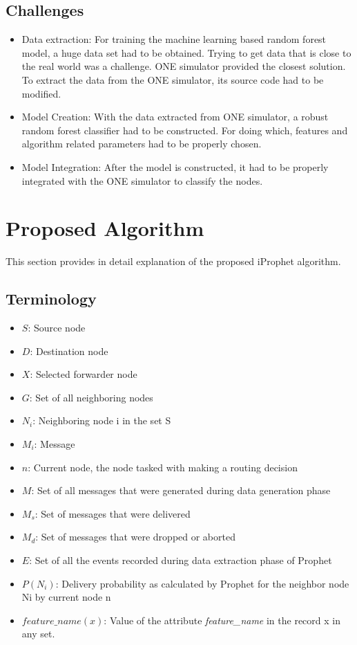 \documentclass[10pt,journal]{IEEEtran}
\begin{document}
\subsection{Challenges}
\begin{itemize}
	\item Data extraction: For training the machine learning based random forest model, a huge data set had to be obtained. Trying to get data that is close to the real world was a challenge. ONE simulator provided the closest solution. To extract the data from the ONE simulator, its source code had to be modified.
	\item Model Creation: With the data extracted from ONE simulator, a robust random forest classifier had to be constructed. For doing which, features and algorithm related parameters had to be properly chosen. 
	\item Model Integration: After the model is constructed, it had to be properly integrated with the ONE simulator to classify the nodes.
\end{itemize}




\section{Proposed Algorithm}
This section provides in detail explanation of the proposed iProphet algorithm.

\subsection{Terminology}
\begin{itemize}
\item $S$: Source node 
\item $D$: Destination node 	
\item $X$: Selected forwarder node 	
\item $G$: Set of all neighboring nodes 
\item $N_i$: Neighboring node i in the set S 
\item $M_i$: Message  
\item $n$: Current node, the node tasked with making a routing decision 
\item $M$: Set of all messages that were generated during data generation phase 
\item $M_s$: Set of messages that were delivered 
\item $M_d$: Set of messages that were dropped or aborted 
\item $E$: Set of all the events recorded during data extraction phase of Prophet 
\item $P(N_i)$: Delivery probability as calculated by Prophet for the neighbor node Ni by current node n 
\item $feature\_name(x)$: Value of the attribute \emph{feature\_name} in the record x in any set. 
\end{itemize}
\end{document}
